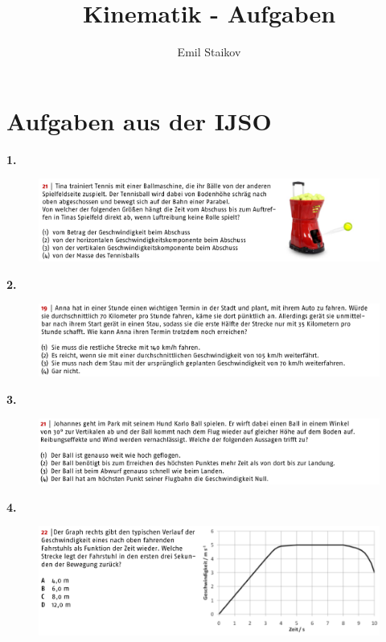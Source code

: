 \documentclass[11pt]{article}
\title{Kinematik - Aufgaben}
\author{Emil Staikov}
\date{}
\begin{document}
\maketitle
\section{Aufgaben aus der IJSO}
\textbf{1.}
\begin{figure}[H]
    \centering
        \includegraphics[width=\textwidth]{aufgabe-1.png}
\end{figure} 
\noindent\textbf{2.} 
\begin{figure}[H]
    \centering
        \includegraphics[width=\textwidth]{aufgabe-2.png}
\end{figure} 
\noindent\textbf{3.} 
\begin{figure}[H]
    \centering
        \includegraphics[width=\textwidth]{aufgabe-3.png}
\end{figure} 
\noindent\textbf{4.} 
\begin{figure}[H]
    \centering
        \includegraphics[width=\textwidth]{aufgabe-4.png}
\end{figure} 
\end{document}
